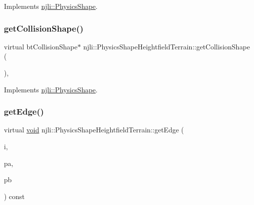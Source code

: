 Implements \mbox{\hyperlink{classnjli_1_1_physics_shape_a527e956caca24bf16ed0d47f69ff14e8}{njli\+::\+Physics\+Shape}}.

\mbox{\label{classnjli_1_1_physics_shape_heightfield_terrain_a43635ec439d573213bae218901050d66}} 
\subsubsection{\texorpdfstring{get\+Collision\+Shape()}{getCollisionShape()}\hspace{0.1cm}{\footnotesize\ttfamily [2/2]}}
{\footnotesize\ttfamily virtual bt\+Collision\+Shape$\ast$ njli\+::\+Physics\+Shape\+Heightfield\+Terrain\+::get\+Collision\+Shape (\begin{DoxyParamCaption}{ }\end{DoxyParamCaption})\hspace{0.3cm}{\ttfamily [protected]}, {\ttfamily [virtual]}}



Implements \mbox{\hyperlink{classnjli_1_1_physics_shape_a2910f0362035c971f245349a55378b01}{njli\+::\+Physics\+Shape}}.

\mbox{\label{classnjli_1_1_physics_shape_heightfield_terrain_ae84a8db205794e8d4ba73b864c2e003f}} 
\subsubsection{\texorpdfstring{get\+Edge()}{getEdge()}}
{\footnotesize\ttfamily virtual \mbox{\hyperlink{_thread_8h_af1e856da2e658414cb2456cb6f7ebc66}{void}} njli\+::\+Physics\+Shape\+Heightfield\+Terrain\+::get\+Edge (\begin{DoxyParamCaption}\item[{int}]{i,  }\item[{bt\+Vector3 \&}]{pa,  }\item[{bt\+Vector3 \&}]{pb }\end{DoxyParamCaption}) const\hspace{0.3cm}{\ttfamily [virtual]}}

